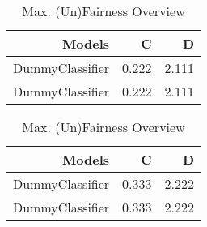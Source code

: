 \begin{table}[ht]
  \caption{ Max. (Un)Fairness Overview}
  \begin{subtable}{\linewidth}
    \centering
    \footnotesize
    \begin{tabular}{rrr}
      \toprule
      Models
        & C& D  \\
      \midrule
      DummyClassifier& 0.222 & 2.111   \\
      DummyClassifier& 0.222 & 2.111   \\
      \bottomrule
    \end{tabular}
  \end{subtable}
  \par\bigskip
  \begin{subtable}{\linewidth}
    \centering
    \footnotesize
    \begin{tabular}{rrr}
      \toprule
      Models
        & C& D  \\
      \midrule
      DummyClassifier& 0.333 & 2.222   \\
      DummyClassifier& 0.333 & 2.222   \\
      \bottomrule
    \end{tabular}
  \end{subtable}
  \par\bigskip
\end{table}
